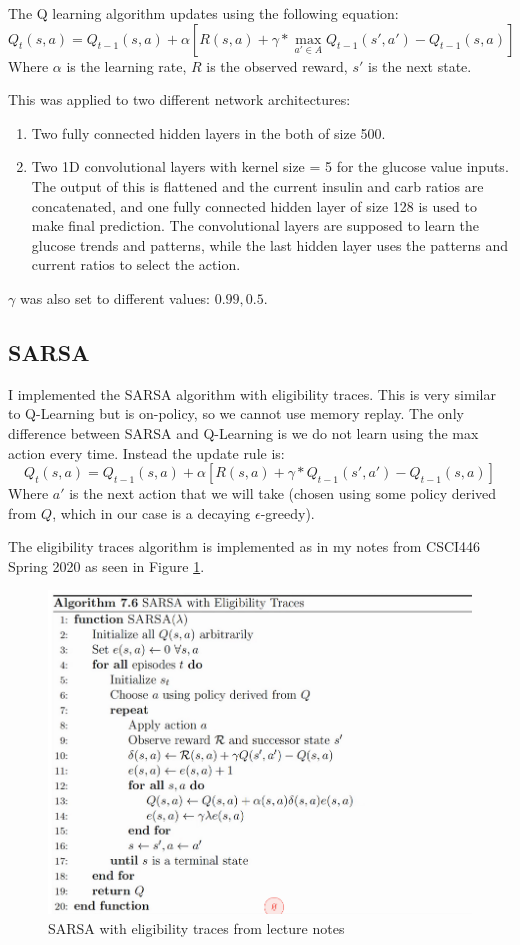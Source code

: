 \documentclass[11pt]{article}
\begin{document}
The Q learning algorithm updates using the following equation:
$$Q_t(s,a) = Q_{t-1}(s, a) + \alpha \left[ R(s,a) + \gamma * \max_{a' \in A} Q_{t-1}(s', a') - Q_{t-1}(s,a) \right]$$
Where $\alpha$ is the learning rate, $R$ is the observed reward, $s'$ is the next state.

This was applied to two different network architectures:
\begin{enumerate}
    \item Two fully connected hidden layers in the both of size 500.
    \item Two 1D convolutional layers with kernel size = 5 for the glucose value inputs. 
    The output of this is flattened and the current insulin and carb ratios are concatenated, 
    and one fully connected hidden layer of size 128 is used to make final prediction.
    The convolutional layers are supposed to learn the glucose trends and patterns, while the last hidden layer uses the patterns and current ratios to select the action.
\end{enumerate}

$\gamma$ was also set to different values: $0.99, 0.5$.

\subsection{SARSA}
I implemented the SARSA algorithm with eligibility traces.
This is very similar to Q-Learning but is on-policy, so we cannot use memory replay. 
The only difference between SARSA and Q-Learning is we do not learn using the max action every time. 
Instead the update rule is:
$$Q_t(s,a) = Q_{t-1}(s, a) + \alpha \left[ R(s,a) + \gamma * Q_{t-1}(s', a') - Q_{t-1}(s,a) \right]$$
Where $a'$ is the next action that we will take (chosen using some policy derived from $Q$, which in our case is a decaying $\epsilon$-greedy).

The eligibility traces algorithm is implemented as in my notes from CSCI446 Spring 2020 as seen in Figure \ref{fig:sarsa}.
\begin{figure}[h] 
    \centering
    \includegraphics[width=0.55 \linewidth]{SARSA.png}
    \caption{SARSA with eligibility traces from lecture notes}
    \label{fig:sarsa}
\end{figure}
\end{document}
